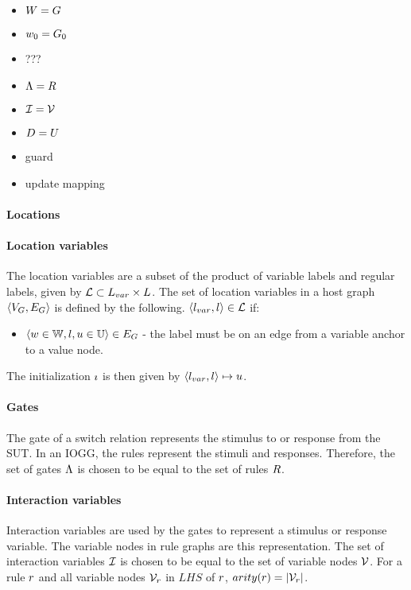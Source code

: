 \begin{itemize}
\item $W = G$
\item $w_0 = G_0$
\item ???
\item $\Lambda = R$
\item $\mathcal{I} = \mathcal{V}$
\item $D = U$
\item guard
\item update mapping
\end{itemize}

\paragraph{Locations}

\paragraph{Location variables}
The location variables are a subset of the product of variable labels and regular labels, given by $\mathcal{L} \subset L_{var} \times L$. The set of location variables in a host graph $\langle V_{G}, E_{G}\rangle$ is defined by the following. $\langle l_{var}, l \rangle \in \mathcal{L}$ if:
\begin{itemize}
\item $\langle w \in \mathbb{W}, l, u \in \mathbb{U} \rangle \in E_{G}$ - the label must be on an edge from a variable anchor to a value node.
\end{itemize}
The initialization $\imath$ is then given by $\langle l_{var}, l \rangle \mapsto u$.

\paragraph{Gates}
The gate of a switch relation represents the stimulus to or response from the SUT. In an IOGG, the rules represent the stimuli and responses. Therefore, the set of gates $\Lambda$ is chosen to be equal to the set of rules $R$.

\paragraph{Interaction variables}
Interaction variables are used by the gates to represent a stimulus or response variable. The variable nodes in rule graphs are this representation. The set of interaction variables $\mathcal{I}$ is chosen to be equal to the set of variable nodes $\mathcal{V}$. For a rule $r$ and all variable nodes $\mathcal{V}_r$ in $\mathit{LHS}$ of $r$, $arity(r) = |\mathcal{V}_r|$. 

